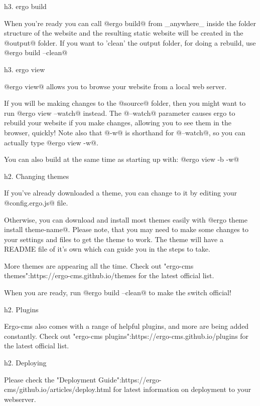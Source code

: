h3. ergo build

When you're ready you can call @ergo build@ from _anywhere_ inside the folder structure of the website and the resulting static website will be created in the @output@ folder. If you want to 'clean' the output folder, for doing a rebuild, use @ergo build --clean@


h3. ergo view

@ergo view@ allows you to browse your website from a local web server.

If you will be making changes to the @source@ folder, then you might want to run @ergo view --watch@ instead. The @--watch@ parameter causes ergo to rebuild your website if you make changes, allowing you to see them in the browser, quickly! Note also that @-w@ is shorthand for @--watch@, so you can actually type @ergo view -w@. 

You can also build at the same time as starting up with: @ergo view -b -w@

h2. Changing themes

If you've already downloaded a theme, you can change to it by editing your @config.ergo.js@ file. 

Otherwise, you can download and install most themes easily with @ergo theme install theme-name@. Please note, that you may need to make some changes to your settings and files to get the theme to work. The theme will have a README file of it's own which can guide you in the steps to take. 

More themes are appearing all the time. Check out "ergo-cms themes":https://ergo-cms.github.io/themes for the latest official list.

When you are ready, run @ergo build --clean@ to make the switch official!

h2. Plugins

Ergo-cms also comes with a range of helpful plugins, and more are being added constantly. Check out "ergo-cms plugins":https://ergo-cms.github.io/plugins for the latest official list.

h2. Deploying

Please check the "Deployment Guide":https://ergo-cms/github.io/articles/deploy.html for latest information on deployment to your webserver.

